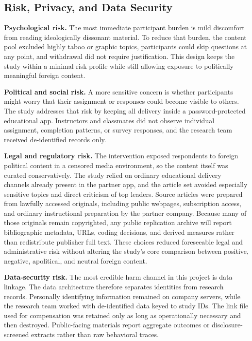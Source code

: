 \documentclass[12pt,american]{article}
\begin{document}
\subsection{Risk, Privacy, and Data Security}

\textbf{Psychological risk.} The most immediate participant burden is mild discomfort from reading ideologically dissonant material. To reduce that burden, the content pool excluded highly taboo or graphic topics, participants could skip questions at any point, and withdrawal did not require justification. This design keeps the study within a minimal-risk profile while still allowing exposure to politically meaningful foreign content.

\textbf{Political and social risk.} A more sensitive concern is whether participants might worry that their assignment or responses could become visible to others. The study addresses that risk by keeping all delivery inside a password-protected educational app. Instructors and classmates did not observe individual assignment, completion patterns, or survey responses, and the research team received de-identified records only.

\textbf{Legal and regulatory risk.} The intervention exposed respondents to foreign political content in a censored media environment, so the content itself was curated conservatively. The study relied on ordinary educational delivery channels already present in the partner app, and the article set avoided especially sensitive topics and direct criticism of top leaders. Source articles were prepared from lawfully accessed originals, including public webpages, subscription access, and ordinary instructional preparation by the partner company. Because many of those originals remain copyrighted, any public replication archive will report bibliographic metadata, URLs, coding decisions, and derived measures rather than redistribute publisher full text. These choices reduced foreseeable legal and administrative risk without altering the study's core comparison between positive, negative, apolitical, and neutral foreign content.

\textbf{Data-security risk.} The most credible harm channel in this project is data linkage. The data architecture therefore separates identities from research records. Personally identifying information remained on company servers, while the research team worked with de-identified data keyed to study IDs. The link file used for compensation was retained only as long as operationally necessary and then destroyed. Public-facing materials report aggregate outcomes or disclosure-screened extracts rather than raw behavioral traces.
\end{document}
